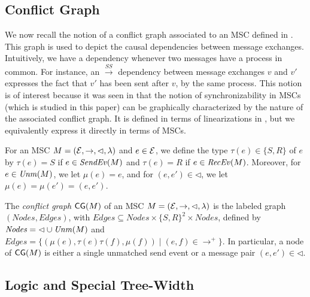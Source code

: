 \documentclass{article}
\begin{document}
\subsection{Conflict Graph}

We now recall the notion of a conflict graph associated to an MSC defined in \cite{DBLP:conf/cav/BouajjaniEJQ18}. This graph is used to depict the causal dependencies between message exchanges.  Intuitively, we have a dependency whenever
two messages have a process in common. For instance, an $\xrightarrow{SS}$
dependency between message exchanges $v$ and $v'$ expresses the fact that
$v'$ has been sent after $v$, by the same process. This notion is of interest because it was seen in \cite{DBLP:conf/cav/BouajjaniEJQ18} that the notion of synchronizability in MSCs (which is studied in this paper) can be graphically characterized by the nature of the associated conflict graph.
It is defined in terms of linearizations
in \cite{DBLP:conf/fossacs/GiustoLL20}, but we equivalently express it
directly in terms of MSCs.

\newcommand{\type}{\tau}
\newcommand{\stype}{S}
\newcommand{\rtype}{R}
\newcommand{\mexch}{\mu}
\newcommand{\Edges}{\mathit{Edges}}
\newcommand{\Nodes}{\mathit{Nodes}}

For an MSC $M = (\mathcal{E}, \rightarrow, \lhd, \lambda)$ and
$e \in \mathcal{E}$, we define the type $\type(e) \in \{\stype,\rtype\}$ of $e$ by $\type(e) = \stype$ if $e \in \mathit{SendEv}(M)$
and $\type(e) = \rtype$ if $e \in \mathit{RecEv}(M)$.
Moreover, for $e \in \mathit{Unm}(M)$, we let $\mexch(e) = e$,
and for $(e,e') \in \lhd$, we let $\mexch(e) = \mexch(e') = (e,e')$.


\begin{definition}
	The \emph{conflict graph} $\mathsf{CG}(M)$ of an MSC $M = (\mathcal{E}, \rightarrow, \lhd, \lambda)$ is the labeled graph $(\Nodes, \Edges)$, with $\Edges \subseteq \Nodes \times \{\stype,\rtype\}^2 \times \Nodes$, defined by
	$\Nodes = {\lhd} \cup \Unm{\msc}$ and $\Edges = \{(\mu(e),\type(e)\type(f),\mu(f)) \mid (e,f) \in {\to^+}\}$.
In particular, a node of $\mathsf{CG}(M)$ is either a single unmatched send event or a message pair $(e,e') \in {\lhd}$.
\end{definition}	

\subsection{Logic and Special Tree-Width}
\end{document}
